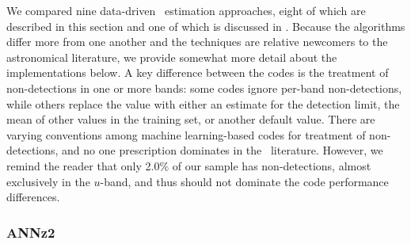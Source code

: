 We compared nine data-driven \pz\ estimation approaches, eight of which are described in this section and one of which is discussed in .
Because the algorithms differ more from one another and the techniques are relative newcomers to the astronomical literature, we provide somewhat more detail about the implementations below.
A key difference between the codes is the treatment of non-detections in one or more bands: 
some codes ignore per-band non-detections, while others replace the value with either an estimate for the detection limit, the mean of other values in the training set, or another default value.
There are varying conventions among machine learning-based codes for treatment of non-detections, and no one prescription dominates in the \pz\ literature.
However, we remind the reader that only 2.0$\%$ of our sample has non-detections, almost exclusively in the $u$-band, and thus should not dominate the code performance differences.

\subsubsection{ANNz2}

